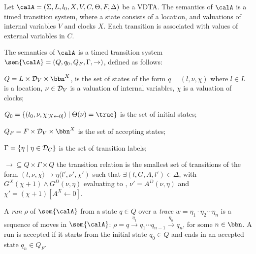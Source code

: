 Let $\calA = \left(\Sigma, L, {l_0}, X, V, C, \Theta, F,  \Delta \right)$  be a VDTA.
The semantics of $\calA$ is a timed transition system,
where a state consists of a location, and valuations of internal variables $V$ and clocks $X$.
Each transition is associated with values of external variables in $C$.

\begin{definition}
	\label{def:vdta:semantics}
	The semantics of $\calA$ is a timed transition system $\sem{\calA}=( Q, q_0, Q_F, \Gamma, \to )$, defined as follows:
	\squishlist
	\item $Q = L \times {\cal D}_V \times \bbn^X$, is the set of states of the form $q= ( l,\nu ,\chi )$ where
	$l \in L$ is a location,
	$\nu \in {\cal D}_V$ is a valuation of internal variables,
	$\chi$ is a valuation of clocks;
	\item $Q_0 = \{ ( l_0,\nu, \chi_{[X \leftarrow 0]} )  \mid \Theta(\nu)=\true \}$ is the set of initial states;
	\item $Q_F = F \times {\cal D}_V \times \bbn^X$ is the set of accepting states;
	\item $\Gamma = \{ \eta \mid
	\eta \in {\cal D}_{C}  \}$ is the set of transition labels;
	\item $\to\subseteq Q\times \Gamma\times Q$  the transition relation
	is the smallest set of transitions of the form
	$( l,\nu,\chi \rangle \longrightarrow {\eta} \langle l',\nu',\chi')$
	such that  $\exists ( l, G, A, l' ) \in \Delta$,
	with $G^X(\chi + 1) \wedge G^D(\nu, \eta) $ evaluating to {\true},
	$\nu'= A^D(\nu, \eta)$ and $\chi'=(\chi+1)[A^X \leftarrow 0]$.
	\squishend
\end{definition}



A {\em run} $\rho$ of $\sem{\calA}$ from a state $q\in Q$ over a {\em trace} $w =  \eta_1\cdot \eta_2\cdots \eta_n$ is a sequence of moves in $\sem{\calA}$:
$\rho = q \xrightarrow {\eta_1} q_1
\cdots q_{n-1}\xrightarrow {\eta_n} q_{n}$,
for some $n\in\bbn$.
A run is accepted if it starts from the initial state $q_0\in Q$ and ends in an accepted state $q_n \in Q_F$.

